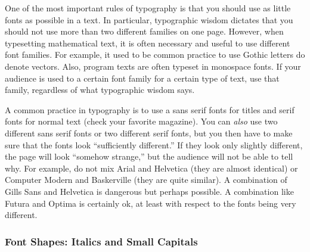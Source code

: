 One of the most important rules of typography is that you should use
as little fonts as possible in a text. In particular, typographic
wisdom dictates that you should not use more than two different
families on one page. However, when typesetting
mathematical text, it is often necessary and useful to use different
font families. For example, it used to be common practice to use
Gothic letters do denote vectors. Also, program texts are often
typeset in monospace fonts. If your audience is used to a certain font
family for a certain type of text, use that family, regardless of what
typographic wisdom says.

A common practice in typography is to use a sans serif fonts for
titles and serif fonts for normal text (check your favorite
magazine). You can \emph{also} use two different sans serif fonts or
two different serif fonts, but you then have to make sure that the
fonts look ``sufficiently different.'' If they look only slightly
different, the page will look ``somehow strange,'' but the audience
will not be able to tell why. For example, do not mix Arial and
Helvetica (they are almost identical) or Computer Modern and
Baskerville (they are quite similar). A combination of Gills Sans and
Helvetica is dangerous but perhaps possible. A combination like Futura
and Optima is certainly ok, at least with respect to the fonts being
very different.




\subsubsection{Font Shapes: Italics and Small Capitals}

\label{section-italics}
\label{section-smallcaps}

